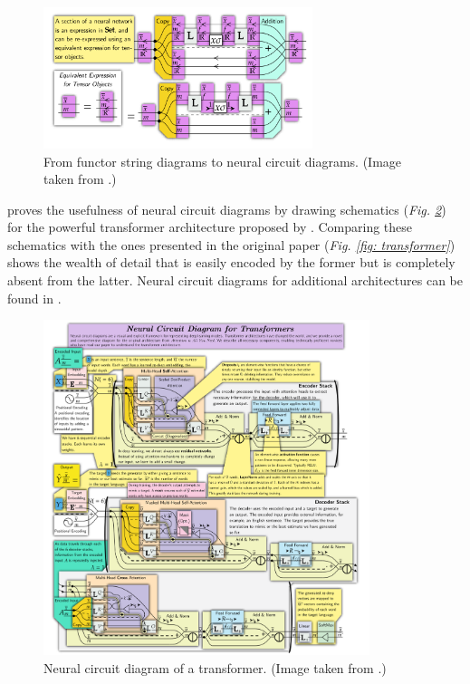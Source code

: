 \documentclass[11pt,a4paper,openright,twoside]{report}
\theoremstyle{plain}
\theoremstyle{definition}
\begin{document}
\begin{figure}[h]
  \begin{center}
    \includegraphics[width=0.7\textwidth]{figures/from_fsd_to_ncd.png}     
    \caption[From functor string diagrams to neural circuit diagrams]{From functor string diagrams to neural circuit diagrams. (Image taken from \cite{abbott2024functor}.)}
    \label{fig: fromfsdtoncd}
  \end{center}
\end{figure}

\cite{abbott2024neural} proves the usefulness of neural circuit diagrams by drawing schematics (\textit{Fig. \ref{fig: transformerncd}}) for the powerful transformer architecture proposed by \cite{vaswani2017attention}. Comparing these schematics with the ones presented in the original paper (\textit{Fig. \ref{fig: transformer}}) shows the wealth of detail that is easily encoded by the former but is completely absent from the latter. Neural circuit diagrams for additional architectures can be found in \cite{abbott2024neural}.

\begin{figure}[h]
  \begin{center}
    \includegraphics[width=0.85\textwidth]{figures/transformer_ncd.png}     
    \caption[Neural circuit diagram of a transformer]{Neural circuit diagram of a transformer. (Image taken from \cite{abbott2023robust}.)}
    \label{fig: transformerncd}
  \end{center}
\end{figure}
\end{document}
